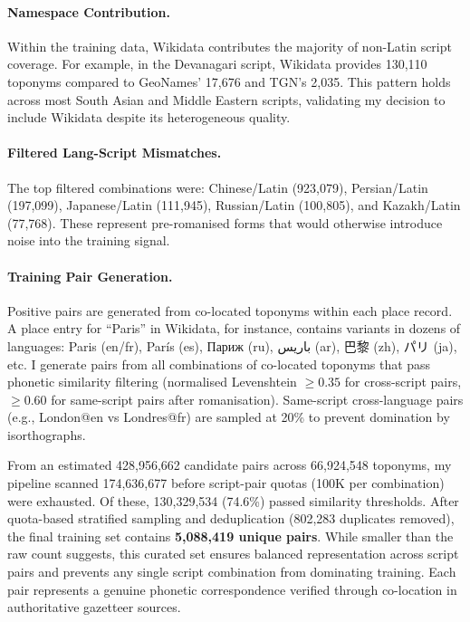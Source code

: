 \documentclass[11pt,a4paper]{article}
\newcommand{\textar}[1]{{\arabicfont #1}}
\newcommand{\textcn}[1]{{\chinesefont #1}}
\begin{document}
\paragraph{Namespace Contribution.} Within the training data, Wikidata contributes the majority of non-Latin script coverage. For example, in the Devanagari script, Wikidata provides 130,110 toponyms compared to GeoNames' 17,676 and TGN's 2,035. This pattern holds across most South Asian and Middle Eastern scripts, validating my decision to include Wikidata despite its heterogeneous quality.

\paragraph{Filtered Lang-Script Mismatches.} The top filtered combinations were: Chinese/Latin (923,079), Persian/Latin (197,099), Japanese/Latin (111,945), Russian/Latin (100,805), and Kazakh/Latin (77,768). These represent pre-romanised forms that would otherwise introduce noise into the training signal.

\paragraph{Training Pair Generation.} Positive pairs are generated from co-located toponyms within each place record. A place entry for ``Paris'' in Wikidata, for instance, contains variants in dozens of languages: Paris (en/fr), París (es), Париж (ru), \textar{باريس} (ar), \textcn{巴黎} (zh), \textcn{パリ} (ja), etc. I generate pairs from all combinations of co-located toponyms that pass phonetic similarity filtering (normalised Levenshtein $\geq 0.35$ for cross-script pairs, $\geq 0.60$ for same-script pairs after romanisation). Same-script cross-language pairs (e.g., London@en vs Londres@fr) are sampled at 20\% to prevent domination by isorthographs.

From an estimated 428,956,662 candidate pairs across 66,924,548 toponyms, my pipeline scanned 174,636,677 before script-pair quotas (100K per combination) were exhausted. Of these, 130,329,534 (74.6\%) passed similarity thresholds. After quota-based stratified sampling and deduplication (802,283 duplicates removed), the final training set contains \textbf{5,088,419 unique pairs}. While smaller than the raw count suggests, this curated set ensures balanced representation across script pairs and prevents any single script combination from dominating training. Each pair represents a genuine phonetic correspondence verified through co-location in authoritative gazetteer sources.
\end{document}
